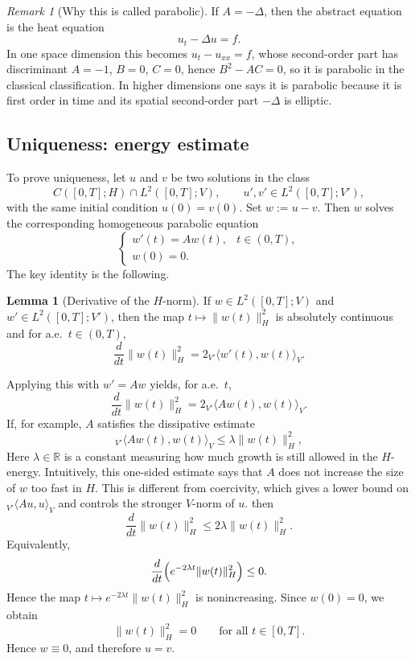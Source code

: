 \documentclass[11pt]{article}
\theoremstyle{definition}
\newtheorem{lemma}{Lemma}
\theoremstyle{remark}
\newtheorem{remark}{Remark}
\newcommand{\dual}[2]{{}_{V'}\langle #1, #2 \rangle_{V}}
\begin{document}
\begin{remark}[Why this is called parabolic]
If $A=-\Delta$, then the abstract equation is the heat equation
\[
u_t-\Delta u=f.
\]
In one space dimension this becomes $u_t-u_{xx}=f$, whose second-order part has discriminant
$A=-1$, $B=0$, $C=0$, hence $B^2-AC=0$, so it is parabolic in the classical classification.
In higher dimensions one says it is parabolic because it is first order in time and its spatial
second-order part $-\Delta$ is elliptic.
\end{remark}

\subsection*{Uniqueness: energy estimate}

To prove uniqueness, let $u$ and $v$ be two solutions in the class
\[
C([0,T];H)\cap L^2([0,T];V),
\qquad
u',v'\in L^2([0,T];V'),
\]
with the same initial condition $u(0)=v(0)$. Set $w:=u-v$. Then $w$ solves the corresponding homogeneous
parabolic equation
\[
\begin{cases}
w'(t)=Aw(t), & t\in(0,T),\\
w(0)=0.
\end{cases}
\]
The key identity is the following.

\begin{lemma}[Derivative of the $H$-norm]
If $w\in L^2([0,T];V)$ and $w'\in L^2([0,T];V')$, then the map $t\mapsto \|w(t)\|_H^2$ is absolutely continuous and for a.e.\ $t\in(0,T)$,
\[
\frac{d}{dt}\|w(t)\|_H^2
=
2\dual{w'(t)}{w(t)}.
\]
\end{lemma}

Applying this with $w'=Aw$ yields, for a.e.\ $t$,
\[
\frac{d}{dt}\|w(t)\|_H^2
=
2\dual{Aw(t)}{w(t)}.
\]
If, for example, $A$ satisfies the dissipative estimate
\[
\dual{Aw(t)}{w(t)}\le \lambda \|w(t)\|_H^2,
\]
Here $\lambda\in\mathbb{R}$ is a constant measuring how much growth is still allowed in the
$H$-energy. Intuitively, this one-sided estimate says that $A$ does not increase the size of $w$
too fast in $H$. This is different from coercivity, which gives a lower bound on
$\dual{Au}{u}$ and controls the stronger $V$-norm of $u$.
then
\[
\frac{d}{dt}\|w(t)\|_H^2 \le 2\lambda \|w(t)\|_H^2.
\]
Equivalently,
\[
\frac{d}{dt}\Bigl(e^{-2\lambda t}\|w(t)\|_H^2\Bigr)\le 0.
\]
Hence the map $t\mapsto e^{-2\lambda t}\|w(t)\|_H^2$ is nonincreasing. Since $w(0)=0$, we obtain
\[
\|w(t)\|_H^2 = 0
\qquad \text{for all } t\in[0,T].
\]
Hence $w\equiv 0$, and therefore $u=v$.
\end{document}
